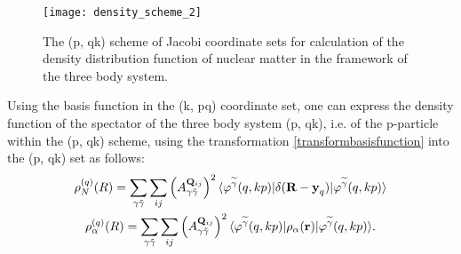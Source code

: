 \documentclass[
12pt, %
oneside, %
english, %
onehalfspacing, %
onehalfspacing, %
headsepline, %
]{MastersDoctoralThesis} %
\begin{document}
\begin{figure}[t]
\centering
\texttt{[image: density\_scheme\_2]}
\decoRule
\caption{\footnotesize The (p, qk) scheme of Jacobi coordinate sets for calculation of the density distribution function of nuclear matter in the framework of  the three body system. }
\label{fig:density_scheme_2}
\end{figure}


Using the basis function in the (k, pq) coordinate set, one can express the density function of the spectator of the three body system (p, qk), i.e. of the p-particle within the (p, qk) scheme,   using the transformation \eqref{transformbasisfunction} into the (p, qk) set as follows: 
\begin{align}
\begin{gathered}
\rho_{N}^{(q)}({R})=
\sum_{\gamma \tilde{\gamma}}
\sum_{ij}
\left( A_{\gamma\tilde{\gamma}}^{ {\bf Q}_{ij} } \right)^2
\langle \varphi^{ \widetilde{\gamma} }(q,kp) 
\vert \delta(\textbf{R}-\textbf{y}_q)
\vert \varphi^{\widetilde{\gamma}}(q,kp)\rangle \\
\rho_{\alpha}^{(q)}({R})= 
\sum_{\gamma \tilde{\gamma}}
\sum_{ij}
\left( A_{\gamma\tilde{\gamma}}^{ {\bf Q}_{ij} } \right)^2
\langle \varphi^{ \widetilde{\gamma} }(q,kp)
\vert \rho_{\alpha}(\textbf{r})
\vert \varphi^{\widetilde{\gamma}}(q,kp)\rangle.\\
\end{gathered}
\end{align}
\end{document}

